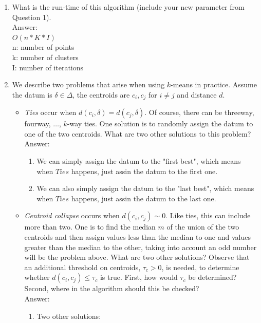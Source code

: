 \documentclass{article}
\begin{document}
\begin{enumerate}
\begin{enumerate}
\begin{enumerate}
\begin{enumerate}
		\end{enumerate}
	\end{enumerate}
\end{enumerate}
\item What is the run-time of this algorithm (include your new parameter from Question 1).\\
Answer:\\
$O(n * K * I)$\\
n: number of points\\
k: number of clusters\\
I: number of iterations\\
\item We describe two problems that arise when using $k$-means in practice.  Assume the datum is $\delta\in\Delta$, the centroids are $c_i, c_j$ for $i\neq j$ and distance $d$.  
\begin{itemize}
\item {\it Ties} occur when $d(c_i, \delta) = d(c_j, \delta)$.  Of course, there can be threeway, fourway, $\ldots$, $k$-way ties.  One solution is to randomly assign the datum to one of the two centroids.   What are two other solutions to this problem?\\
Answer:
\begin{enumerate}
	\item We can simply assign the datum to the "first best", which means when $Ties$ happens, just assin the datum to the first one.
	\item We can also simply assign the datum to the "last best", which means when $Ties$ happens, just assin the datum to the last one.
\end{enumerate}
\item {\it Centroid collapse} occurs when $d(c_i, c_j) \sim 0$. Like ties, this can include more than two.  One is to find the median $m$ of the union of the two centroids and then assign values less than the median to one and values greater than the median to the other, taking into account an odd number will be the problem above.  What are two other solutions?  Observe that an additional threshold on centroids, $\tau_c > 0$, is needed, to determine whether $d(c_i, c_j) \leq \tau_c$ is true.  First, how would $\tau_c$ be determined?  Second, where in the algorithm should this be checked?\\
Answer:\\
\begin{enumerate}
	\item Two other solutions:
	\begin{enumerate}

\end{enumerate}
\end{enumerate}
\end{itemize}
\end{enumerate}
\end{document}

